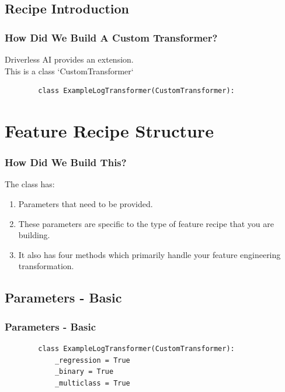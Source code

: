 \documentclass[11pt,
               aspectratio=169,
               hyperref={colorlinks}
               ]{beamer}
\begin{document}
	\subsection{Recipe Introduction}
	\begin{frame}[fragile]
		\frametitle{How Did We Build A Custom Transformer?}
		Driverless AI provides an extension. \\
		This is a class `CustomTransformer`
		\begin{verbatim}
		class ExampleLogTransformer(CustomTransformer):
		\end{verbatim}
\end{frame}
		\section{Feature Recipe Structure}
	\begin{frame}[fragile]
		\frametitle{How Did We Build This?}
		The class has:
		\begin{enumerate}
			\item Parameters that need to be provided. 
			\item These parameters are specific to the type of feature recipe that you are building. 
			\item It also has four methods which primarily handle your feature engineering transformation. 
		\end{enumerate}
			
\end{frame}
		\subsection{Parameters - Basic}
	\begin{frame}[fragile]
		\frametitle{Parameters - Basic}
		\begin{verbatim}
		class ExampleLogTransformer(CustomTransformer):
			_regression = True
			_binary = True
			_multiclass = True
		\end{verbatim}
			
\end{frame}
\end{document}
